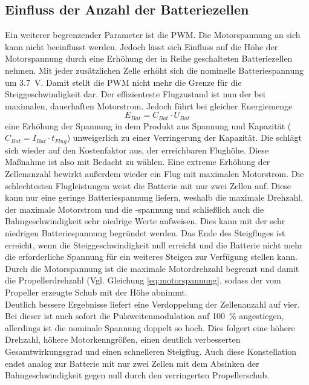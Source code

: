 \subsection{Einfluss der Anzahl der Batteriezellen}
\label{subsec:einfluss_n_bat}
Ein weiterer begrenzender Parameter ist die PWM. Die Motorspannung an sich kann nicht beeinflusst werden. Jedoch lässt sich Einfluss auf die Höhe der Motorspannung durch eine Erhöhung der in Reihe geschalteten Batteriezellen nehmen. Mit jeder zusätzlichen Zelle erhöht sich die nominelle Batteriespannung um \SI{3,7}{V}. Damit stellt die PWM nicht mehr die Grenze für die Steiggeschwindigkeit dar. Der effizienteste Flugzustand ist nun der bei maximalen, dauerhaften Motorstrom. Jedoch führt bei gleicher Energiemenge 
\begin{equation}
	E_{Bat} = C_{Bat}\cdot U_{Bat}
\end{equation}
eine Erhöhung der Spannung in dem Produkt aus Spannung und Kapazität (\ensuremath{C_{Bat} = I_{Bat}\cdot t_{Flug}}) unweigerlich zu einer Verringerung der Kapazität. Die schlägt sich wieder auf den Kostenfaktor aus, der erreichbaren Flughöhe. Diese Maßnahme ist also mit Bedacht zu wählen. Eine extreme Erhöhung der Zellenanzahl bewirkt außerdem wieder ein Flug mit maximalen Motorstrom.
Die schlechtesten Flugleistungen weist die Batterie mit nur zwei Zellen auf. Diese kann nur eine geringe Batteriespannung liefern, weshalb die maximale Drehzahl, der maximale Motorstrom und die -spannung und schließlich auch die Bahngeschwindigkeit sehr niedrige Werte aufweisen. Dies kann mit der sehr niedrigen Batteriespannung begründet werden. Das Ende des Steigfluges ist erreicht, wenn die Steiggeschwindigkeit null erreicht und die Batterie nicht mehr die erforderliche Spannung für ein weiteres Steigen zur Verfügung stellen kann. Durch die Motorspannung ist die maximale Motordrehzahl begrenzt und damit die Propellerdrehzahl (Vgl. Gleichung \ref{eq:motorspannung}, sodass der vom Propeller erzeugte Schub mit der Höhe abnimmt.\\
Deutlich bessere Ergebnisse liefert eine Verdoppelung der Zellenanzahl auf vier. Bei dieser ist auch sofort die Pulsweitenmodulation auf \SI{100}{\%} angestiegen, allerdings ist die nominale Spannung doppelt so hoch. Dies folgert eine höhere Drehzahl, höhere Motorkenngrößen, einen deutlich verbesserten Gesamtwirkungsgrad und einen schnelleren Steigflug. Auch diese Konstellation endet analog zur Batterie mit nur zwei Zellen mit dem Absinken der Bahngeschwindigkeit gegen null durch den verringerten Propellerschub. \\
